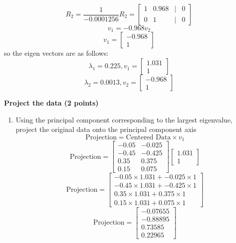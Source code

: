 \documentclass[a3paper,12pt]{extarticle} %
\begin{document}
\begin{enumerate}
\begin{enumerate}
\[        R_2 = \frac{1}{-0.0001256}R_2 = \begin{bmatrix}1 & 0.968 & | & 0\\0 & 1 & | & 0\end{bmatrix}
        \]
        \[
        v_1 = -0.968v_2
        \]
        \[
        v_1 = \begin{bmatrix}-0.968\\1\end{bmatrix}
        \]
        so the eigen vectors are as follows:
        \[
        \lambda_1 = 0.225, v_1 = \begin{bmatrix}1.031\\1\end{bmatrix}
        \]
        \[
        \lambda_2 = 0.0013, v_2 = \begin{bmatrix}-0.968\\1\end{bmatrix}
        \]
    \end{enumerate}
    \subitem \textbf{Project the data (2 points)}
    \begin{enumerate}
        \item Using the principal component corresponding to the largest eigenvalue, project the original data onto the principal component axis
        \[
        \text{Projection} = \text{Centered Data} \times v_1
        \]
        \[
        \text{Projection} = \begin{bmatrix}-0.05 & -0.025\\-0.45 & -0.425\\0.35 & 0.375\\0.15 & 0.075\end{bmatrix} \begin{bmatrix}1.031\\1\end{bmatrix}
        \]
        \[
        \text{Projection} = \begin{bmatrix}-0.05 \times 1.031 + -0.025 \times 1\\-0.45 \times 1.031 + -0.425 \times 1\\0.35 \times 1.031 + 0.375 \times 1\\0.15 \times 1.031 + 0.075 \times 1\end{bmatrix}
        \]
        \[
        \text{Projection} = \begin{bmatrix}-0.07655\\-0.88895\\0.73585\\0.22965\end{bmatrix}
\]
\end{enumerate}
\end{enumerate}
\end{document}
